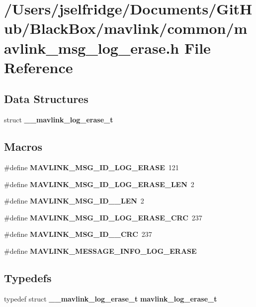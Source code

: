 \section{/\+Users/jselfridge/\+Documents/\+Git\+Hub/\+Black\+Box/mavlink/common/mavlink\+\_\+msg\+\_\+log\+\_\+erase.h File Reference}
\label{mavlink__msg__log__erase_8h}
\subsection*{Data Structures}
\begin{DoxyCompactItemize}
\item 
struct \textbf{ \+\_\+\+\_\+mavlink\+\_\+log\+\_\+erase\+\_\+t}
\end{DoxyCompactItemize}
\subsection*{Macros}
\begin{DoxyCompactItemize}
\item 
\#define \textbf{ M\+A\+V\+L\+I\+N\+K\+\_\+\+M\+S\+G\+\_\+\+I\+D\+\_\+\+L\+O\+G\+\_\+\+E\+R\+A\+SE}~121
\item 
\#define \textbf{ M\+A\+V\+L\+I\+N\+K\+\_\+\+M\+S\+G\+\_\+\+I\+D\+\_\+\+L\+O\+G\+\_\+\+E\+R\+A\+S\+E\+\_\+\+L\+EN}~2
\item 
\#define \textbf{ M\+A\+V\+L\+I\+N\+K\+\_\+\+M\+S\+G\+\_\+\+I\+D\+\_\+\_\+\+L\+EN}~2
\item 
\#define \textbf{ M\+A\+V\+L\+I\+N\+K\+\_\+\+M\+S\+G\+\_\+\+I\+D\+\_\+\+L\+O\+G\+\_\+\+E\+R\+A\+S\+E\+\_\+\+C\+RC}~237
\item 
\#define \textbf{ M\+A\+V\+L\+I\+N\+K\+\_\+\+M\+S\+G\+\_\+\+I\+D\+\_\+\_\+\+C\+RC}~237
\item 
\#define \textbf{ M\+A\+V\+L\+I\+N\+K\+\_\+\+M\+E\+S\+S\+A\+G\+E\+\_\+\+I\+N\+F\+O\+\_\+\+L\+O\+G\+\_\+\+E\+R\+A\+SE}
\end{DoxyCompactItemize}
\subsection*{Typedefs}
\begin{DoxyCompactItemize}
\item 
typedef struct \textbf{ \+\_\+\+\_\+mavlink\+\_\+log\+\_\+erase\+\_\+t} \textbf{ mavlink\+\_\+log\+\_\+erase\+\_\+t}
\end{DoxyCompactItemize}


